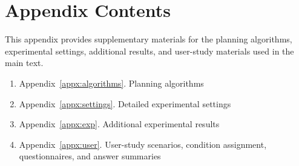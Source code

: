 \setcounter{secnumdepth}{3}
\section*{Appendix Contents}
This appendix provides supplementary materials for the planning algorithms, experimental settings, additional results, and user-study materials used in the main text.

\begin{enumerate}
  \item Appendix~\ref{appx:algorithms}. Planning algorithms
  \item Appendix~\ref{appx:settings}. Detailed experimental settings
  \item Appendix~\ref{appx:exp}. Additional experimental results
  \item Appendix~\ref{appx:user}. User-study scenarios, condition assignment, questionnaires, and answer summaries
\end{enumerate}
